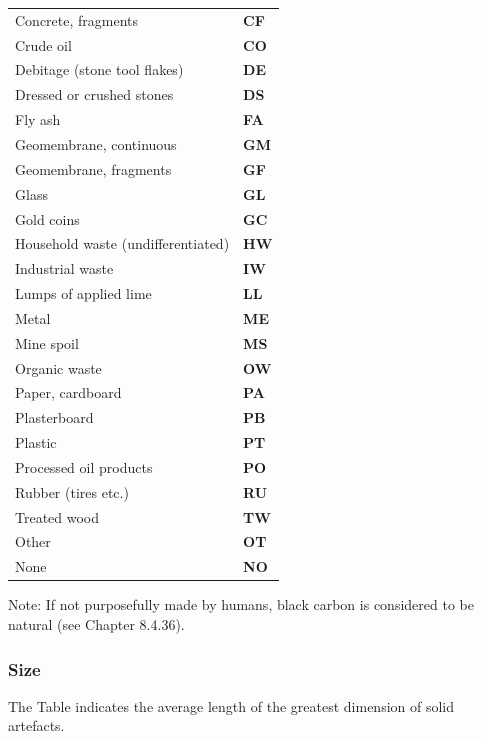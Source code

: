 \documentclass[
  letterpaper,
  DIV=11,
  numbers=noendperiod]{scrreprt}
\begin{document}
\begin{longtable}[]{@{}
  >{\raggedright\arraybackslash}p{}
  >{\raggedright\arraybackslash}p{}@{}}
Concrete, fragments & \textbf{CF} \\
Crude oil & \textbf{CO} \\
Debitage (stone tool flakes) & \textbf{DE} \\
Dressed or crushed stones & \textbf{DS} \\
Fly ash & \textbf{FA} \\
Geomembrane, continuous & \textbf{GM} \\
Geomembrane, fragments & \textbf{GF} \\
Glass & \textbf{GL} \\
Gold coins & \textbf{GC} \\
Household waste (undifferentiated) & \textbf{HW} \\
Industrial waste & \textbf{IW} \\
Lumps of applied lime & \textbf{LL} \\
Metal & \textbf{ME} \\
Mine spoil & \textbf{MS} \\
Organic waste & \textbf{OW} \\
Paper, cardboard & \textbf{PA} \\
Plasterboard & \textbf{PB} \\
Plastic & \textbf{PT} \\
Processed oil products & \textbf{PO} \\
Rubber (tires etc.) & \textbf{RU} \\
Treated wood & \textbf{TW} \\
Other & \textbf{OT} \\
None & \textbf{NO} \\
\bottomrule()
\end{longtable}

Note: If not purposefully made by humans, black carbon is considered to
be natural (see Chapter 8.4.36).

\hypertarget{size}{%
\subsubsection{Size}\label{size}}

The Table indicates the average length of the greatest dimension of
solid artefacts.
\end{document}
